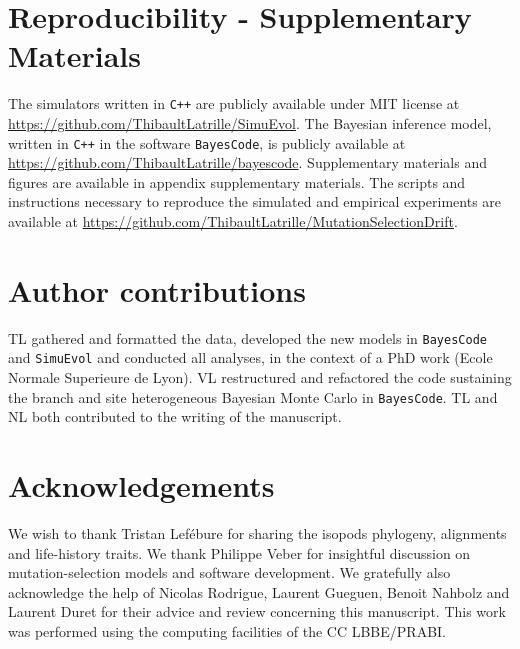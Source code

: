 \documentclass{MBE}
\begin{document}
	\section{Reproducibility - Supplementary Materials}
	The simulators written in \texttt{C++} are publicly available under MIT license at \url{https://github.com/ThibaultLatrille/SimuEvol}.
	The Bayesian inference model, written in \texttt{C++} in the software \texttt{BayesCode}, is publicly available at \url{https://github.com/ThibaultLatrille/bayescode}.
	Supplementary materials and figures are available in appendix supplementary materials.
	The scripts and instructions necessary to reproduce the simulated and empirical experiments are available at \url{https://github.com/ThibaultLatrille/MutationSelectionDrift}.

	\section{Author contributions}
	TL gathered and formatted the data, developed the new models in \texttt{BayesCode} and \texttt{SimuEvol} and conducted all analyses, in the context of a PhD work (Ecole Normale Superieure de Lyon).
	VL restructured and refactored the code sustaining the branch and site heterogeneous Bayesian Monte Carlo in \texttt{BayesCode}.
	TL and NL both contributed to the writing of the manuscript.

	\section{Acknowledgements}
	We wish to thank Tristan Lefébure for sharing the isopods phylogeny, alignments and life-history traits.
	We thank Philippe Veber for insightful discussion on mutation-selection models and software development.
	We gratefully also acknowledge the help of Nicolas Rodrigue, Laurent Gueguen, Benoit Nahbolz and Laurent Duret for their advice and review concerning this manuscript.
	This work was performed using the computing facilities of the CC LBBE/PRABI.

	
\end{document}
